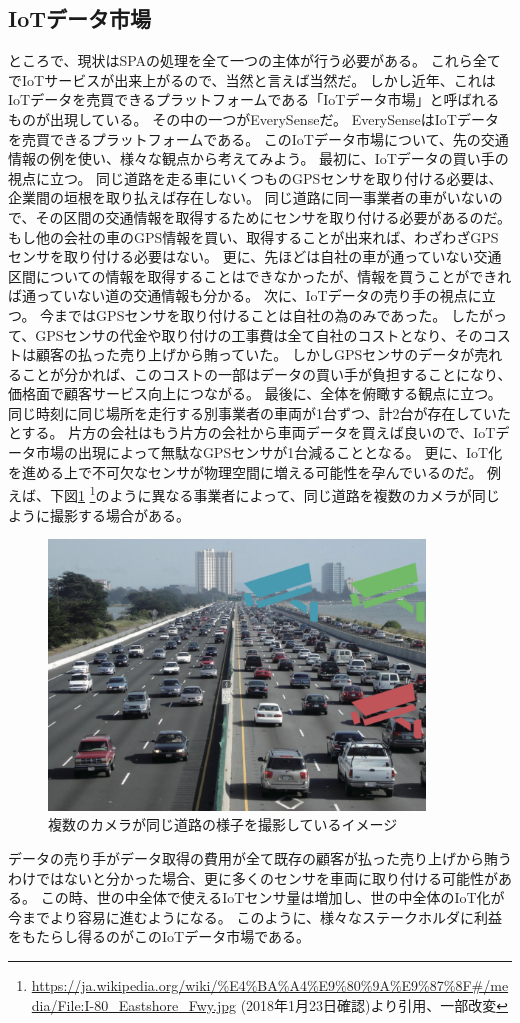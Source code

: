 \subsection{IoTデータ市場}
ところで、現状はSPAの処理を全て一つの主体が行う必要がある。
これら全てでIoTサービスが出来上がるので、当然と言えば当然だ。
しかし近年、これはIoTデータを売買できるプラットフォームである「IoTデータ市場」と呼ばれるものが出現している。
その中の一つがEverySense\cite{everysense}だ。
EverySenseはIoTデータを売買できるプラットフォームである。
このIoTデータ市場について、先の交通情報の例を使い、様々な観点から考えてみよう。
最初に、IoTデータの買い手の視点に立つ。
同じ道路を走る車にいくつものGPSセンサを取り付ける必要は、企業間の垣根を取り払えば存在しない。
同じ道路に同一事業者の車がいないので、その区間の交通情報を取得するためにセンサを取り付ける必要があるのだ。
もし他の会社の車のGPS情報を買い、取得することが出来れば、わざわざGPSセンサを取り付ける必要はない。
更に、先ほどは自社の車が通っていない交通区間についての情報を取得することはできなかったが、情報を買うことができれば通っていない道の交通情報も分かる。
次に、IoTデータの売り手の視点に立つ。
今まではGPSセンサを取り付けることは自社の為のみであった。
したがって、GPSセンサの代金や取り付けの工事費は全て自社のコストとなり、そのコストは顧客の払った売り上げから賄っていた。
しかしGPSセンサのデータが売れることが分かれば、このコストの一部はデータの買い手が負担することになり、価格面で顧客サービス向上につながる。
最後に、全体を俯瞰する観点に立つ。
同じ時刻に同じ場所を走行する別事業者の車両が1台ずつ、計2台が存在していたとする。
片方の会社はもう片方の会社から車両データを買えば良いので、IoTデータ市場の出現によって無駄なGPSセンサが1台減ることとなる。
更に、IoT化を進める上で不可欠なセンサが物理空間に増える可能性を孕んでいるのだ。
例えば、下図\ref{CarTraffic} \footnote{\url{https://ja.wikipedia.org/wiki/\%E4\%BA\%A4\%E9\%80\%9A\%E9\%87\%8F#/media/File:I-80_Eastshore_Fwy.jpg} (2018年1月23日確認)より引用、一部改変}のように異なる事業者によって、同じ道路を複数のカメラが同じように撮影する場合がある。
\begin{figure}[htbp]
 \centering
  \includegraphics[width=100mm]{image/CarTraffic.png}
 \caption{複数のカメラが同じ道路の様子を撮影しているイメージ}
 \label{CarTraffic}
\end{figure}
データの売り手がデータ取得の費用が全て既存の顧客が払った売り上げから賄うわけではないと分かった場合、更に多くのセンサを車両に取り付ける可能性がある。
この時、世の中全体で使えるIoTセンサ量は増加し、世の中全体のIoT化が今までより容易に進むようになる。
このように、様々なステークホルダに利益をもたらし得るのがこのIoTデータ市場である。

